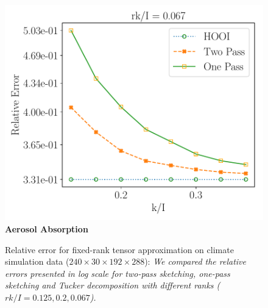 \begin{figure}[H]
\begin{subfigure}{0.31\textwidth}
    \end{subfigure}
    \includegraphics[scale = 0.29]{figure/ABSORB_frk15.pdf}
    \textbf{Aerosol Absorption}
\caption{Relative error for fixed-rank tensor approximation on climate simulation data ($240 \times 30 \times 192 \times 288$): \textit{We compared the relative errors presented in log scale for two-pass sketching, one-pass sketching and Tucker decomposition with different ranks ($rk/I = 0.125,0.2,0.067$).}} \label{fig:application}
\end{figure}
